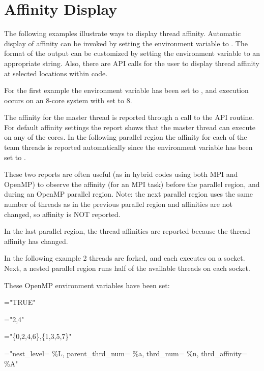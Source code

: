 \section{Affinity Display}
\label{sec:affinity_display}

The following examples illustrate ways to display thread affinity.
Automatic display of affinity can be invoked by setting
the  environment variable to .  
The format of the output can be customized by setting the 
 environment variable to an appropriate string.  
Also, there are API calls for the user to display thread affinity 
at selected locations within code.

For the first example the environment variable  has been
set to , and execution occurs on an 8-core system with  set to 8.

The affinity for the master thread is reported through a call to the API
 routine. For default affinity settings
the report shows that the master thread can execute on any of the cores. 
In the following parallel region the affinity for each of the team threads is reported
automatically since the  environment variable has been set
to .

These two reports are often useful (as in hybrid codes using both MPI and OpenMP) 
to observe the affinity (for an MPI task) before the parallel region,
and during an OpenMP parallel region. Note: the next parallel region uses the 
same number of threads as in the previous parallel region and affinities are 
not changed, so affinity is NOT reported.

In the last parallel region, the thread affinities are reported
because the thread affinity has changed.




In the following example 2 threads are forked, and each executes on a socket. Next,
a nested parallel region runs half of the available threads on each socket.

These OpenMP environment variables have been set:

\begin{compactitem}
\item {}="TRUE"
\item {}="2,4"
\item {}="\{0,2,4,6\},\{1,3,5,7\}"
\item {}="nest\_level= \%L, parent\_thrd\_num= \%a, thrd\_num= \%n, thrd\_affinity= \%A"
\end{compactitem}

